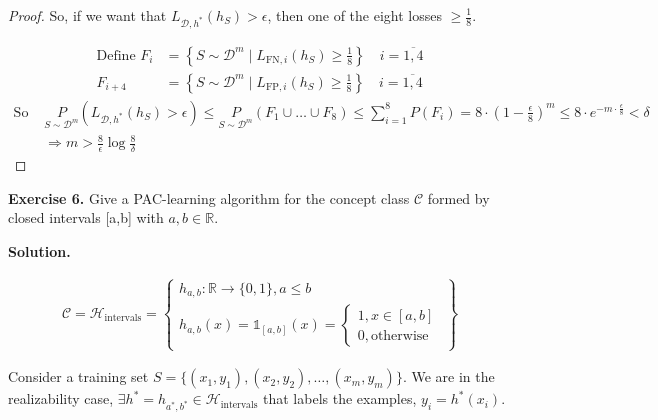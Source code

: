 \documentclass{article}
\newcommand{\<}{\langle}
\renewcommand{\>}{\rangle}
\theoremstyle{definition}
\def\gC{{\mathcal{C}}}
\def\gD{{\mathcal{D}}}
\def\gH{{\mathcal{H}}}
\def\sR{{\mathbb{R}}}
\def\sone{{\mathds{1}}}
\newcommand{\uset}{\underset}
\newcommand{\psdm}{\uset{S \sim \gD^m}{P}}
\newcommand{\hs}{h_S}
\def\sone{{\mathds{1}}}
\newcommand{\uset}{\underset}
\newcommand{\psdm}{\uset{S \sim \gD^m}{P}}
\newcommand{\hs}{h_S}
\begin{document}
\begin{proof}
\phantom{.}

So, if we want that $L_{\gD, h^*}(\hs) > \epsilon$, then one of the eight losses
$\geq \frac{1}{8}$.

\begin{align*}
\text{Define } F_i &= \left\{S \sim \gD^m \mid L_{\text{FN}, i}(\hs) \geq \frac{1}{8} \right\}
\quad i = \overline{1, 4} \\
F_{i+4} &= \left\{S \sim \gD^m \mid L_{\text{FP}, i}(\hs) \geq \frac{1}{8} \right\}
\quad i = \overline{1, 4}
\end{align*}
\begin{align*}
\text{So } &\psdm(L_{\gD, h^*}(\hs) > \epsilon) \leq \psdm(F_1 \cup \dots \cup F_8) \leq
  \sum_{i=1}^8 P(F_i) = 8 \cdot \left(1- \frac{\epsilon}{8} \right)^m \leq
  8 \cdot e^{-m \cdot \frac{\epsilon}{8}} < \delta \\
  &\Rightarrow \boxed{m > \frac{8}{\epsilon} \log \frac{8}{\delta}}
\end{align*} 

\end{proof}

\textbf{Exercise 6.} Give a PAC-learning algorithm for the concept class $\mathcal{C}$ formed by closed intervals [a,b] with $a, b \in \mathbb{R}$.

\vspace{1mm}

\textbf{Solution.}

\begin{align*}
\gC = \gH_\text{intervals}
    = \left\lbrace
      \begin{array}{ll}      
        h_{a, b} \colon \sR \rightarrow \{0, 1\}, a \leq b \\
        h_{a, b}(x) = \sone_{[a, b]}(x) = \left\lbrace
          \begin{array}{ll}
            1, x \in [a, b] \\
            0, \text{otherwise}
          \end{array}
          \right.
      \end{array}
    \right\rbrace
\end{align*}

Consider a training set $S = \{(x_1, y_1), (x_2, y_2), \dots, (x_m, y_m)\}$.
We are in the realizability case, ${\exists h^* = h_{a^*, b^*} \in \gH_\text{intervals}}$
that labels the examples, $y_i = h^*(x_i)$.
\end{document}
